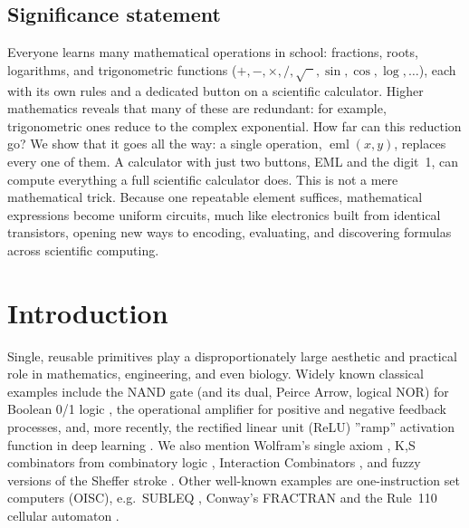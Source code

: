\documentclass[12pt]{article}
\DeclareMathOperator{\eml}{eml}
\begin{document}
\clearpage


\subsection*{Significance statement}
Everyone learns many mathematical operations in school: 
fractions, roots, logarithms, and trigonometric functions ($+, -, \times, /, \sqrt{\phantom{x}}, \sin, \cos, \log, \ldots$),
each with its own rules and a dedicated button on a scientific calculator. Higher mathematics reveals that many of these are redundant: for example, trigonometric ones reduce to the complex exponential. How far can this reduction go? We show that it goes all the way: a single operation, $\eml(x,y)$, replaces every one of them. A calculator with just two buttons, EML and the digit~1, can compute everything a full scientific calculator does. This is not a mere mathematical trick. Because one repeatable element suffices, mathematical expressions become uniform circuits, much like electronics built from identical transistors, opening new ways to encoding, evaluating, and discovering formulas across scientific computing.

\clearpage



\section{Introduction}


Single, reusable primitives play a disproportionately large aesthetic and practical role in mathematics, engineering, and even biology. Widely known classical examples include the NAND gate (and its dual, Peirce Arrow, logical NOR) for Boolean 0/1 logic \cite{Sheffer1913,Lukasiewicz1963Elements}, the operational amplifier \cite{6767960} for positive and negative feedback processes, and, more recently, the rectified linear unit (ReLU) ''ramp'' activation function \cite{NairHinton2010ReLU} in deep learning \cite{GoodfellowDL}. 
We also mention Wolfram's single axiom \cite{NKS}, K,S combinators from combinatory logic \cite{Schonfinkel1924,CurryFeys1958}, Interaction Combinators \cite{Lafont1997InteractionCombinators}, and fuzzy versions of the Sheffer stroke \cite{FuzzyLogicSheffer}. Other well-known examples are one-instruction set computers (OISC), e.g.\ SUBLEQ \cite{mazonka2011}, Conway's FRACTRAN \cite{Conway1987} and the Rule~110 cellular automaton \cite{NKS, cook2004Rule110}. 
\end{document}
